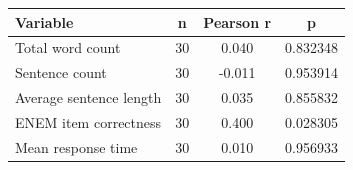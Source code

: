 \begin{tabular}{lccc}
\toprule
Variable & n & Pearson r & p\\
\midrule
Total word count & 30 & 0.040 & 0.832348\\
Sentence count & 30 & -0.011 & 0.953914\\
Average sentence length & 30 & 0.035 & 0.855832\\
ENEM item correctness & 30 & 0.400 & 0.028305\\
Mean response time & 30 & 0.010 & 0.956933\\
\bottomrule
\end{tabular}
